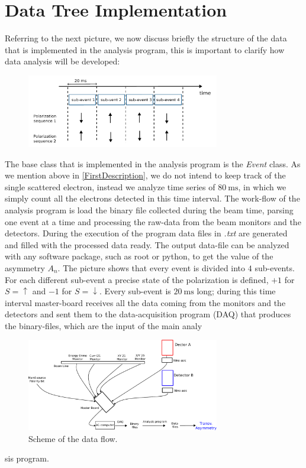 \newpage
\section{Data Tree Implementation}

Referring to the next picture, we now discuss briefly the structure of the data that is implemented in the analysis program, this is important to clarify how data analysis will be developed:

\begin{figure}[hbtp]
\centering
\includegraphics[width = 0.75\textwidth]{ExperimentalSetup/EventStructure.pdf}
\caption{}
\end{figure}

The base class that is implemented in the analysis program is the \textit{Event} class. As we mention above in \ref{FirstDescription}, we do not intend to keep track of the single scattered electron, instead we analyze time series of $\SI{80}{\milli \second}$, in which we simply count all the electrons detected in this time interval. The work-flow of the analysis program is load the binary file collected during the beam time, parsing  one event at a time and processing the raw-data from the beam monitors and the detectors. During the execution of the program data files in \textit{.txt} are generated and filled with the processed data ready. The output data-file can be analyzed with any software package, such as root or python, to get the value of the asymmetry $A_{n}$. 
The picture shows that every event is divided into $4$ sub-events. For each different sub-event a precise state of the polarization is defined, 
$+1$ for $S = \uparrow$ and $-1$ for $S = \downarrow$. Every sub-event is $\SI{20}{\milli \second}$ long; during this time interval master-board receives all the data coming from the monitors and the detectors and sent them to the data-acquisition program (DAQ) that produces the binary-files, which are the input of the main analy\begin{figure}[hbtp]

\centering
\includegraphics[width = 0.75\textwidth]{Analysis/Electronic_scheme.pdf}
\caption{Scheme of the data flow.}
\end{figure}
sis program.

